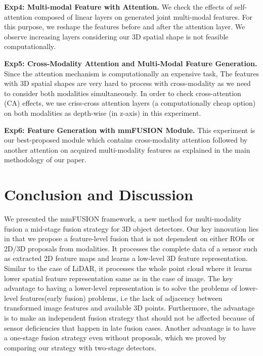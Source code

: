 \documentclass[10pt,twocolumn,letterpaper]{article}
\begin{document}
\textbf{Exp4: Multi-modal Feature with Attention.}
%
We check the effects of self-attention composed of linear layers on generated joint multi-modal features. For this purpose, we reshape the features before and after the attention layer. We observe increasing layers considering our 3D spatial shape is not feasible computationally. 

\textbf{Exp5: Cross-Modality Attention and Multi-Modal Feature Generation.}
%
Since the attention mechanism is computationally an expensive task, The features with 3D spatial shapes are very hard to process with cross-modality as we need to consider both modalities simultaneously. In order to check cross-attention (CA) effects, we use criss-cross attention layers \cite{huang2019ccnet} (a computationally cheap option) on both modalities as depth-wise (in z-axis) in this experiment. 

\textbf{Exp6: Feature Generation with mmFUSION Module.}
%
This experiment is our best-proposed module which contains cross-modality attention followed by another attention on acquired multi-modality features as explained in the main methodology of our paper. 

\textbf{}






\section{Conclusion and Discussion}
We presented the mmFUSION framework, a new method for multi-modality fusion a mid-stage fusion strategy for 3D object detectors. Our key innovation lies in that we propose a feature-level fusion that is not dependent on either ROIs or 2D/3D proposals from modalities. It processes the complete data of a sensor such as extracted 2D feature maps and learns a low-level 3D feature representation. Similar to the case of LiDAR, it processes the whole point cloud where it learns lower spatial feature representation same as in the case of image. The key advantage to having a lower-level representation is to solve the problems of lower-level features(early fusion) problems, i.e the lack of adjacency between transformed image features and available 3D points.
Furthermore, the advantage is to make an independent fusion strategy that should not be affected because of sensor deficiencies that happen in late fusion cases. 
 Another advantage is to have a one-stage fusion strategy even without proposals, which we proved by comparing our strategy with two-stage detectors. 
\end{document}
